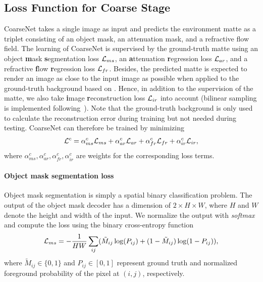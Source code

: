\subsection{Loss Function for Coarse Stage}
\label{sub:Loss Function for CoarseNet}
CoarseNet takes a single image as input and predicts the environment matte as a triplet consisting of an object mask, an attenuation mask, and a refractive flow field. The learning of CoarseNet is supervised by the ground-truth matte using an object \textbf{m}ask \textbf{s}egmentation loss $\mathcal{L}_{ms}$, an \textbf{a}ttenuation \textbf{r}egression loss $\mathcal{L}_{ar}$, and a refractive \textbf{f}low \textbf{r}egression loss $\mathcal{L}_{fr}$. Besides, the predicted matte is expected to render an image as close to the input image as possible when applied to the ground-truth background based on . Hence, in addition to the supervision of the matte, we also take \textbf{i}mage \textbf{r}econstruction loss $\mathcal{L}_{ir}$ into account (bilinear sampling is implemented following~\cite{jaderberg2015spatial}). Note that the ground-truth background is only used to calculate the reconstruction error during training but not needed during testing. CoarseNet can therefore be trained by minimizing 
\begin{align}
    \mathcal{L}^c = \alpha^c_{ms} \mathcal{L}_{ms} + \alpha^c_{ar} \mathcal{L}_{ar} + \alpha^c_{fr} \mathcal{L}_{fr} + \alpha^c_{ir} \mathcal{L}_{ir},
\end{align}
where 
$\alpha^c_{ms}, \alpha^c_{ar}, \alpha^c_{fr}, \alpha^c_{ir}$ are weights for the corresponding loss terms. 

\paragraph{Object mask segmentation loss}
\label{par:Object Mask Classification Loss}
Object mask segmentation is simply a spatial binary classification problem. The output of the object mask decoder has a dimension of $2\times H\times W$, where $H$ and $W$ denote the height and width of the input. We normalize the output with {\em softmax} and compute the loss using the binary cross-entropy function
\begin{equation}
    \mathcal{L}_{ms} = -\frac{1}{HW} \sum_{ij} (\tilde{M}_{ij}\log(P_{ij}) + (1-\tilde{M}_{ij}) \log(1-P_{ij})),
\end{equation}
where $\tilde{M}_{ij} \in \{0,1\}$ and $P_{ij}\in [0,1]$ represent ground truth and normalized foreground probability of the pixel at $(i, j)$, respectively.

